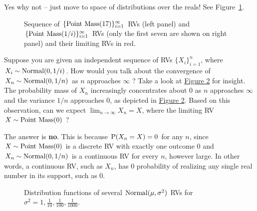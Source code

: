 Yes why not -- just move to space of distributions over the reals! See Figure~\ref{F:SequenceOfPointMassRVS17And1Byi}.

\begin{figure}[htpb]
\caption{Sequence of $\{\pointmass(17)\}_{i=1}^{\infty}$ RVs (left panel) and $\{\pointmass(1/i)\}_{i=1}^{\infty}$ RVs (only the first seven are shown on right panel) and their limiting RVs in red.\label{F:SequenceOfPointMassRVS17And1Byi}}
\centering   {}
\end{figure}

\begin{classwork}\label{CW:Normal01bynConvToPointMass0}
Suppose you are given an independent sequence of RVs $\{X_i \}_{i=1}^n$, where $X_i \sim \normal(0,1/i)$.  How would you talk about the convergence of $X_n \sim \normal(0,1/n)$ as $n$ approaches $\infty$ ?  Take a look at \hyperref[F:PlotNormal01bynConvToPointMass0]{Figure \ref*{F:PlotNormal01bynConvToPointMass0}} for insight.  The probability mass of $X_n$ increasingly concentrates about $0$ as $n$ approaches $\infty$ and the variance $1/n$ approaches $0$, as depicted in \hyperref[F:PlotNormal01bynConvToPointMass0]{Figure \ref*{F:PlotNormal01bynConvToPointMass0}}.  Based on this observation, can we expect $\lim_{n \rightarrow \infty} X_n = X$, where the limiting RV $X \sim \pointmass(0)$ ?

The answer is {\bf no}.  This is because $\P(X_n=X)=0$ for any $n$, since $X \sim \pointmass(0)$ is a discrete RV with exactly one outcome $0$ and $X_n \sim \normal(0,1/n)$ is a continuous RV for every $n$, however large.  In other words, a continuous RV, such as $X_n$, has $0$ probability of realizing any single real number in its support, such as $0$.    
\begin{figure}[htpb]
\caption{Distribution functions of several $\normal(\mu,\sigma^2)$ RVs for $\sigma^2 = 1,\frac{1}{10},\frac{1}{100},\frac{1}{1000}$.\label{F:PlotNormal01bynConvToPointMass0}}
\centering   {}
\end{figure}
\end{classwork}

